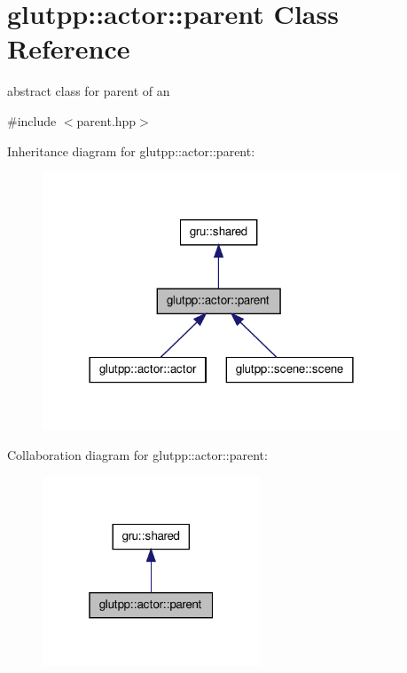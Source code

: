 \hypertarget{classglutpp_1_1actor_1_1parent}{\section{glutpp\-:\-:actor\-:\-:parent \-Class \-Reference}
\label{classglutpp_1_1actor_1_1parent}
}


abstract class for parent of an   




{\ttfamily \#include $<$parent.\-hpp$>$}



\-Inheritance diagram for glutpp\-:\-:actor\-:\-:parent\-:
\nopagebreak
\begin{figure}[H]
\begin{center}
\leavevmode
\includegraphics[width=302pt]{classglutpp_1_1actor_1_1parent__inherit__graph}
\end{center}
\end{figure}


\-Collaboration diagram for glutpp\-:\-:actor\-:\-:parent\-:
\nopagebreak
\begin{figure}[H]
\begin{center}
\leavevmode
\includegraphics[width=184pt]{classglutpp_1_1actor_1_1parent__coll__graph}
\end{center}
\end{figure}
